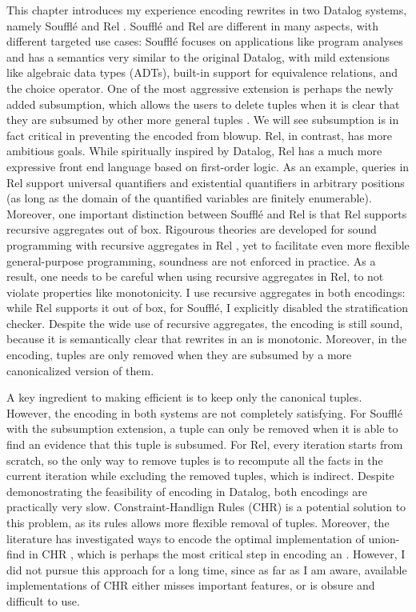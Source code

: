 This chapter introduces my experience encoding \egraph rewrites 
 in two Datalog systems, namely Souffl\'e \citep{souffle} and Rel \citep{rel-doc}.
Souffl\'e and Rel are different in many aspects, with different targeted use cases:
 Souffl\'e focuses on applications like program analyses
 and has a semantics very similar to the original Datalog,
 with mild extensions like algebraic data types (ADTs),
 built-in support for equivalence relations, and the choice operator.
One of the most aggressive extension is perhaps
 the newly added subsumption,
 which allows the users to delete tuples 
 when it is clear that they are subsumed by other more general tuples \citep{datalog-subsumption}.
We will see subsumption is in fact critical in preventing the encoded \egraphs from blowup.
Rel, in contrast, has more ambitious goals.
While spiritually inspired by Datalog, 
 Rel has a much more expressive front end language based on first-order logic.
As an example, 
 queries in Rel support universal quantifiers and existential quantifiers in arbitrary positions
 (as long as the domain of the quantified variables are finitely enumerable).
Moreover,
 one important distinction between Souffl\'e and Rel is
 that Rel supports recursive aggregates out of box.
Rigourous theories are developed 
 for sound programming with recursive aggregates in Rel \citep{datalogo-convergence},
 yet to facilitate even more flexible general-purpose programming,
 soundness are not enforced in practice.
As a result,
 one needs to be careful when using recursive aggregates in Rel,
 to not violate properties like monotonicity.
I use recursive aggregates in both encodings:
 while Rel supports it out of box, 
 for Souffl\'e, I explicitly disabled the stratification checker.
Despite the wide use of recursive aggregates, the encoding is still sound,
 because it is semantically clear that rewrites in an \egraph is monotonic.
Moreover, in the encoding,
 tuples are only removed when they are subsumed by a more canonicalized version of them.

A key ingredient to making \egraph efficient is 
 to keep only the canonical tuples.
However, the encoding in both systems are not completely satisfying.
For Souffl\'e with the subsumption extension,
 a tuple can only be removed when it is able to find an evidence 
 that this tuple is subsumed.
For Rel, every iteration starts from scratch,
 so the only way to remove tuples is 
 to recompute all the facts in the current iteration while excluding the removed tuples,
 which is indirect.
Despite demonostrating the feasibility of encoding \egraphs in Datalog, 
 both encodings are practically very slow.
Constraint-Handlign Rules (CHR) \citep{chr} is a potential solution to this problem,
 as its rules allows more flexible removal of tuples.
Moreover,
 the literature has investigated 
 ways to encode the optimal implementation of union-find in CHR \citep{uf-chr},
 which is perhaps the most critical step in encoding an \egraph.
However, I did not pursue this approach for a long time, 
 since as far as I am aware, available implementations of CHR either misses important features,
 or is obsure and difficult to use.

